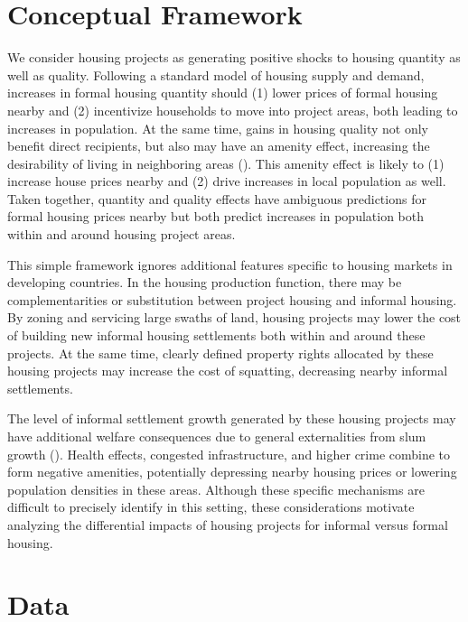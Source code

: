 \documentclass[12pt]{article}
\begin{document}
\section{Conceptual Framework}\label{section:model}

We consider housing projects as generating positive shocks to housing quantity as well as quality.  Following a standard model of housing supply and demand, increases in formal housing quantity should (1) lower prices of formal housing nearby and (2) incentivize households to move into project areas, both leading to increases in population.  At the same time, gains in housing quality not only benefit direct recipients, but also may have an amenity effect, increasing the desirability of living in neighboring areas (\cite{diamond2016wants}).  This amenity effect is likely to (1) increase house prices nearby and (2) drive increases in local population as well.  Taken together, quantity and quality effects have ambiguous predictions for formal housing prices nearby but both predict increases in population both within and around housing project areas.

This simple framework ignores additional features specific to housing markets in developing countries.  In the housing production function, there may be complementarities or substitution between project housing and informal housing.  By zoning and servicing large swaths of land, housing projects may lower the cost of building new informal housing settlements both within and around these projects.  At the same time, clearly defined property rights allocated by these housing projects may increase the cost of squatting, decreasing nearby informal settlements.

The level of informal settlement growth generated by these housing projects may have additional welfare consequences due to general externalities from slum growth (\cite{10.1257/jep.27.4.187}).  Health effects, congested infrastructure, and higher crime combine to form negative amenities, potentially depressing nearby housing prices or lowering population densities in these areas.  Although these specific mechanisms are difficult to precisely identify in this setting, these considerations motivate analyzing the differential impacts of housing projects for informal versus formal housing.


\section{Data}\label{section:data}
\end{document}

